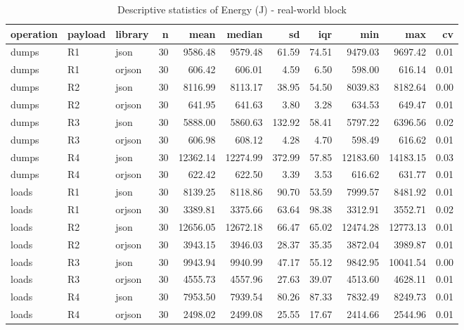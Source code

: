 \begin{table}[ht]
\centering
\begin{tabular}{lllrrrrrrrr}
  \toprule
operation & payload & library & n & mean & median & sd & iqr & min & max & cv \\ 
  \midrule
dumps & R1 & json &  30 & 9586.48 & 9579.48 & 61.59 & 74.51 & 9479.03 & 9697.42 & 0.01 \\ 
  dumps & R1 & orjson &  30 & 606.42 & 606.01 & 4.59 & 6.50 & 598.00 & 616.14 & 0.01 \\ 
  dumps & R2 & json &  30 & 8116.99 & 8113.17 & 38.95 & 54.50 & 8039.83 & 8182.64 & 0.00 \\ 
  dumps & R2 & orjson &  30 & 641.95 & 641.63 & 3.80 & 3.28 & 634.53 & 649.47 & 0.01 \\ 
  dumps & R3 & json &  30 & 5888.00 & 5860.63 & 132.92 & 58.41 & 5797.22 & 6396.56 & 0.02 \\ 
  dumps & R3 & orjson &  30 & 606.98 & 608.12 & 4.28 & 4.70 & 598.49 & 616.62 & 0.01 \\ 
  dumps & R4 & json &  30 & 12362.14 & 12274.99 & 372.99 & 57.85 & 12183.60 & 14183.15 & 0.03 \\ 
  dumps & R4 & orjson &  30 & 622.42 & 622.50 & 3.39 & 3.53 & 616.62 & 631.77 & 0.01 \\ 
  loads & R1 & json &  30 & 8139.25 & 8118.86 & 90.70 & 53.59 & 7999.57 & 8481.92 & 0.01 \\ 
  loads & R1 & orjson &  30 & 3389.81 & 3375.66 & 63.64 & 98.38 & 3312.91 & 3552.71 & 0.02 \\ 
  loads & R2 & json &  30 & 12656.05 & 12672.18 & 66.47 & 65.02 & 12474.28 & 12773.13 & 0.01 \\ 
  loads & R2 & orjson &  30 & 3943.15 & 3946.03 & 28.37 & 35.35 & 3872.04 & 3989.87 & 0.01 \\ 
  loads & R3 & json &  30 & 9943.94 & 9940.99 & 47.17 & 55.12 & 9842.95 & 10041.54 & 0.00 \\ 
  loads & R3 & orjson &  30 & 4555.73 & 4557.96 & 27.63 & 39.07 & 4513.60 & 4628.11 & 0.01 \\ 
  loads & R4 & json &  30 & 7953.50 & 7939.54 & 80.26 & 87.33 & 7832.49 & 8249.73 & 0.01 \\ 
  loads & R4 & orjson &  30 & 2498.02 & 2499.08 & 25.55 & 17.67 & 2414.66 & 2544.96 & 0.01 \\ 
   \bottomrule
\end{tabular}
\caption{Descriptive statistics of Energy (J) - real-world block} 
\label{tab:rw_desc_E}
\end{table}
